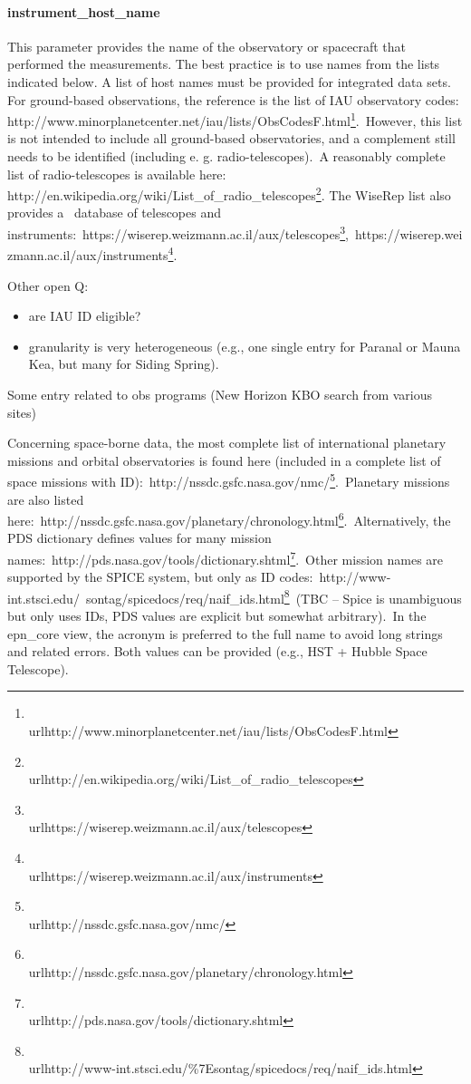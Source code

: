 \documentclass[11pt,a4paper]{ivoa}
\begin{document}
\paragraph{instrument\_host\_name}

This parameter provides the name of the observatory or spacecraft that performed the measurements. The best practice is to use names from the lists indicated below. A list of host names must be provided for integrated data sets. For ground-based observations, the reference is the list of IAU observatory codes: http://www.minorplanetcenter.net/iau/lists/ObsCodesF.html\footnote{\\url{http://www.minorplanetcenter.net/iau/lists/ObsCodesF.html}}. However, this list is not intended to include all ground-based observatories, and a complement still needs to be identified (including e. g. radio-telescopes). A reasonably complete list of radio-telescopes is available here: http://en.wikipedia.org/wiki/List\_of\_radio\_telescopes\footnote{\\url{http://en.wikipedia.org/wiki/List\_of\_radio\_telescopes}}. The WiseRep list also provides a  database of telescopes and instruments: https://wiserep.weizmann.ac.il/aux/telescopes\footnote{\\url{https://wiserep.weizmann.ac.il/aux/telescopes}}, https://wiserep.weizmann.ac.il/aux/instruments\footnote{\\url{https://wiserep.weizmann.ac.il/aux/instruments}}. 

Other open Q:

\begin{itemize}
\item are IAU ID eligible?
\item granularity is very heterogeneous (e.g., one single entry for Paranal or Mauna Kea, but many for Siding Spring).
\end{itemize}

Some entry related to obs programs (New Horizon KBO search from various sites)

Concerning space-borne data, the most complete list of international planetary missions and orbital observatories is found here (included in a complete list of space missions with ID): http://nssdc.gsfc.nasa.gov/nmc/\footnote{\\url{http://nssdc.gsfc.nasa.gov/nmc/}}. Planetary missions are also listed here: http://nssdc.gsfc.nasa.gov/planetary/chronology.html\footnote{\\url{http://nssdc.gsfc.nasa.gov/planetary/chronology.html}}. Alternatively, the PDS dictionary defines values for many mission names: http://pds.nasa.gov/tools/dictionary.shtml\footnote{\\url{http://pds.nasa.gov/tools/dictionary.shtml}}. Other mission names are supported by the SPICE system, but only as ID codes: http://www-int.stsci.edu/~sontag/spicedocs/req/naif\_ids.html\footnote{\\url{http://www-int.stsci.edu/\%7Esontag/spicedocs/req/naif\_ids.html}} (TBC – Spice is unambiguous but only uses IDs, PDS values are explicit but somewhat arbitrary). In the epn\_core view, the acronym is preferred to the full name to avoid long strings and related errors. Both values can be provided (e.g., HST + Hubble Space Telescope).
\end{document}
